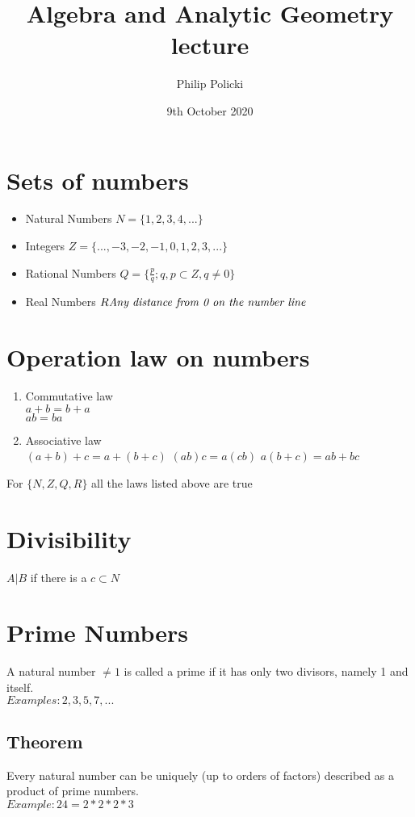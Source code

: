 \documentclass{article}
\title{ Algebra and Analytic Geometry lecture }
\author{Philip Policki}
\date{9th October 2020}
\begin{document}
\maketitle
\tableofcontents
\pagebreak
\section{Sets of numbers}
	\begin{itemize}
		\item Natural Numbers $N = \{1, 2, 3, 4, ...\}$
		\item Integers $Z = \{ ..., -3, -2, -1, 0, 1, 2, 3, ... \}$
		\item Rational Numbers $Q = \{  \frac{p}{q}; q,p \subset Z, q \neq 0  \}$
		\item Real Numbers $R \emph{Any distance from 0 on the number line}$
	\end{itemize}

\section{Operation law on numbers}

	\begin{enumerate}
	\item Commutative law \\ 
	$ a + b = b + a$ \\
	$ ab = ba $ 
	\item Associative law \\ 
	$ (a + b) + c = a + (b + c) $
	$ (ab)c = a(cb)$
	$ a(b+ c) = ab + bc $ 
	\end{enumerate}
For $\{N, Z, Q, R\}$ all the laws listed above are true 
\section{Divisibility}
	$A|B$  if there is a $c \subset N $
	
\section{Prime Numbers}
	A natural number $\neq 1$ is called a prime if it has only two divisors, namely 1 and itself. \\
	$Examples: 2, 3, 5, 7, ...$
	
	\subsection{Theorem}
	Every natural number can be uniquely (up to orders of factors) described as a product of prime numbers.\\
	$ Example: 24 = 2*2*2*3$
\end{document}
